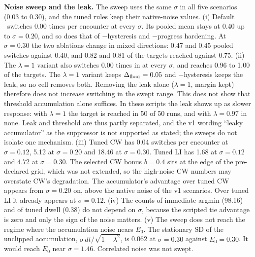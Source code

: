 \noindent\textbf{Noise sweep and the leak.} The sweep uses the same $\sigma$ in all five scenarios (0.03 to 0.30), and the tuned rules keep their native-noise values. (i) Default \sname\ switches 0.00 times per  encounter at every $\sigma$. Its pooled mean stays at 0.40 up to $\sigma=0.20$, and so does that of $-$hysteresis and $-$progress hardening. At $\sigma=0.30$ the two ablations change in mixed directions: 0.47 and 0.45 pooled switches against 0.40, and 0.82 and 0.81 of the targets reached against 0.75. (ii) The $\lambda=1$ variant also switches 0.00 times in  at every $\sigma$, and reaches 0.96 to 1.00 of the targets. The $\lambda=1$ variant keeps $\Delta_{\text{floor}}=0.05$ and $-$hysteresis keeps the leak, so no cell removes both. Removing the leak alone ($\lambda=1$, margin kept) therefore does not increase  switching in the swept range. This does not show that threshold accumulation alone suffices. In these scripts the leak shows up as slower response: with $\lambda=1$ the  target is reached in 50 of 50 runs, and with $\lambda=0.97$ in none. Leak and threshold are thus partly separated, and the v1 wording ``leaky accumulator'' as the suppressor is not supported as stated; the sweeps do not isolate one mechanism. (iii) Tuned CW has 0.04 switches per  encounter at $\sigma=0.12$, 5.12 at $\sigma=0.20$ and 18.46 at $\sigma=0.30$. Tuned LI has 1.68 at $\sigma=0.12$ and 4.72 at $\sigma=0.30$. The selected CW bonus $b=0.4$ sits at the edge of the pre-declared grid, which was not extended, so the high-noise CW numbers may overstate CW's degradation. The accumulator's advantage over tuned CW appears from $\sigma=0.20$ on, above the native noise of the v1 scenarios. Over tuned LI it already appears at $\sigma=0.12$. (iv) The  counts of immediate argmin (98.16) and of tuned dwell (0.38) do not depend on $\sigma$, because the scripted tie advantage is zero and only the sign of the noise matters. (v) The sweep does not reach the regime where the accumulation noise nears $E_0$. The stationary SD of the unclipped accumulation, $\sigma\,dt/\sqrt{1-\lambda^2}$, is 0.062 at $\sigma=0.30$ against $E_0=0.30$. It would reach $E_0$ near $\sigma=1.46$. Correlated noise was not swept.



